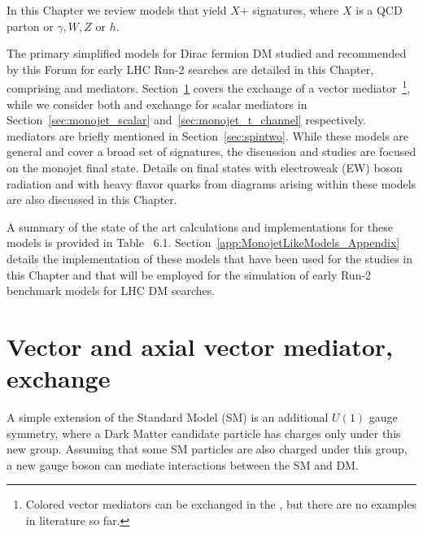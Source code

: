 


In this Chapter we review 
models that yield $X$+\MET{} signatures,
where $X$ is a QCD parton or $\gamma, W, Z$ or $h$.

The primary simplified models for Dirac fermion DM studied and recommended by this Forum 
for early LHC Run-2 searches are detailed in this Chapter, 
comprising \spinzero and \spinone mediators. Section~\ref{sec:monojet_V} covers the
\schannel exchange of a vector mediator~\footnote{Colored vector mediators 
can be exchanged in the \tchannel, but there are no examples in literature so far.}, 
while we consider both \schannel and \tchannel exchange for scalar mediators in
Section~\ref{sec:monojet_scalar} and~\ref{sec:monojet_t_channel} respectively. 
\Spintwo mediators are briefly mentioned in Section~\ref{sec:spintwo}.
While these models are general and cover a broad set of signatures,
the discussion and studies are focused on the monojet final state. 
Details on final states with electroweak (EW) boson radiation and with heavy flavor quarks 
from diagrams arising within these models are also discussed in this Chapter.

A summary of the state of the art calculations and implementations for these models 
is provided in Table~%
6.1. Section~\ref{app:MonojetLikeModels_Appendix}
details the implementation of these models that
have been used for the studies in this Chapter and that will be employed
for the simulation of early Run-2 benchmark models for LHC DM searches. 


\section{Vector and axial vector mediator, \schannel exchange}
\label{sec:monojet_V}

A simple extension of the Standard Model (SM) is an
additional $U(1)$ gauge symmetry, where a Dark Matter
candidate particle has charges only under this new group.
Assuming that some SM particles are also charged under
this group, a new gauge boson can mediate interactions
between the SM and DM.   

